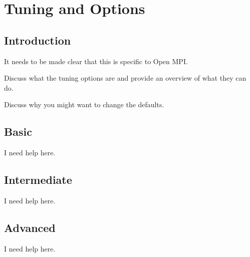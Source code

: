 \chapter{Tuning and Options}

\section{Introduction}

\todo It needs to be made clear that this is specific to Open MPI.

\todo Discuss what the tuning options are and provide an overview of what
they can do. 

\todo Discuss why you might want to change the defaults.

\section{Basic}

\todo I need help here.

\section{Intermediate}

\todo I need help here.

\section{Advanced}

\todo I need help here.

